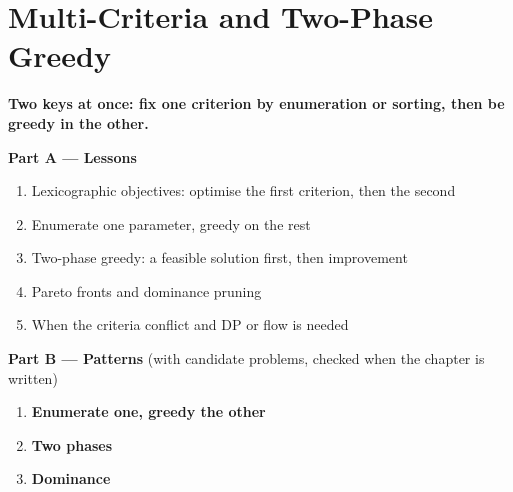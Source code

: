 \chapter{Multi-Criteria and Two-Phase Greedy}
\label{ch:multi_criteria}

\begin{tcolorbox}[enhanced, colback=white, colframe=secondaryblue, boxrule=1pt, arc=2mm]
\textbf{\large\textcolor{primaryblue}{Two keys at once: fix one criterion by enumeration or sorting, then be greedy in the other.}}
\end{tcolorbox}


\begin{plannedbox}
\textbf{Part A --- Lessons}
\begin{enumerate}[leftmargin=*, label=\textbf{A\arabic*.}, itemsep=1pt]
    \item Lexicographic objectives: optimise the first criterion, then the second
    \item Enumerate one parameter, greedy on the rest
    \item Two-phase greedy: a feasible solution first, then improvement
    \item Pareto fronts and dominance pruning
    \item When the criteria conflict and DP or flow is needed
\end{enumerate}
\textbf{Part B --- Patterns} (with candidate problems, checked when the chapter is written)
\begin{enumerate}[leftmargin=*, label=\textbf{P\arabic*.}, itemsep=1pt]
    \item \textbf{Enumerate one, greedy the other}
    \item \textbf{Two phases}
    \item \textbf{Dominance}
\end{enumerate}
\end{plannedbox}
